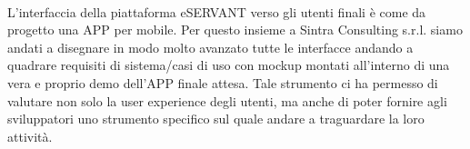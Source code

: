 \begin{figure}[htp]
\end{figure}

\paragraph{}
L’interfaccia della piattaforma eSERVANT verso gli utenti finali è come da progetto una APP per mobile.
Per questo insieme a Sintra Consulting s.r.l. siamo andati a disegnare in modo molto avanzato tutte le interfacce andando a quadrare requisiti di sistema/casi di uso con mockup montati all’interno di una vera e proprio demo dell’APP finale attesa.
Tale strumento ci ha permesso di valutare non solo la user experience degli utenti, ma anche di poter fornire agli sviluppatori uno strumento specifico sul quale andare a traguardare la loro attività.

